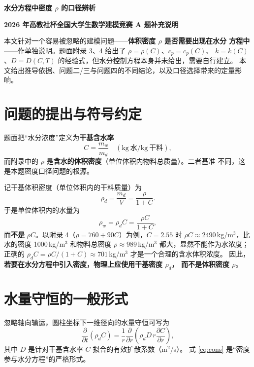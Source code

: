 \documentclass[12pt,a4paper,fontset=none]{ctexart}
\begin{document}
\begin{center}
  {\bfseries 水分方程中密度 $\rho$ 的口径辨析}
\end{center}

\vspace{0.4em}
\begin{center}
  {\bfseries 2026 年高教社杯全国大学生数学建模竞赛 A 题补充说明}
\end{center}

\vspace{1em}
\noindent
本文针对一个容易被忽略的建模问题——\textbf{体积密度 $\rho$ 是否需要出现在水分
方程中}——作单独说明。题面附录 3、4 给出了 $\rho=\rho(C)$、$c_p=c_p(C)$、
$k=k(C)$、$D=D(C,T)$ 的经验式，但水分控制方程本身并未给出，需要自行建立。
本文给出推导依据、问题二/三与问题四的不同结论，以及口径选择带来的定量影响。

\section{问题的提出与符号约定}

题面把``水分浓度''定义为\textbf{干基含水率}
\begin{equation}
  C=\frac{m_w}{m_d}\quad(\mathrm{kg\ 水}/\mathrm{kg\ 干料}),
\end{equation}
而附录中的 $\rho$ 是\textbf{含水的体积密度}（单位体积内物料总质量）。二者基准
不同，这是本题密度口径问题的根源。

记干基体积密度（单位体积内的干料质量）为
\begin{equation}
  \rho_d=\frac{m_d}{V}=\frac{\rho}{1+C}.
\end{equation}
于是单位体积内的水量为
\begin{equation}
  \rho_w=\rho_d C=\frac{\rho C}{1+C},
\end{equation}
而\textbf{不是} $\rho C$。以附录 4（$\rho=760+90C$）为例，$C=2.55$ 时
$\rho C\approx 2490$\,kg/m$^3$，比水的密度 1000\,kg/m$^3$ 和物料总密度
$\rho\approx 989$\,kg/m$^3$ 都大，显然不能作为水浓度；正确的
$\rho_d C=\rho C/(1+C)\approx 701$\,kg/m$^3$ 才是一个合理的含水体积浓度。
因此，\textbf{若要在水分方程中引入密度，物理上应使用干基密度 $\rho_d$，
而不是体积密度 $\rho$}。

\section{水量守恒的一般形式}

忽略轴向输运，圆柱坐标下一维径向的水量守恒可写为
\begin{equation}
  \frac{\partial}{\partial t}\left(\rho_d C\right)
  =\frac{1}{r}\frac{\partial}{\partial r}
   \left(\rho_d D\,r\frac{\partial C}{\partial r}\right),
  \label{eq:cons}
\end{equation}
其中 $D$ 是针对干基含水率 $C$ 拟合的有效扩散系数（m$^2$/s）。
式 \eqref{eq:cons} 是``密度参与水分方程''的严格形式。
\end{document}
